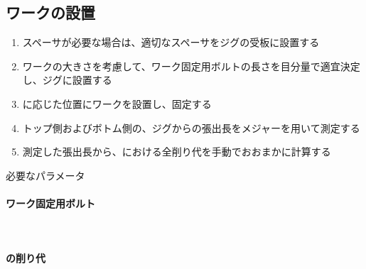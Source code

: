 \subsection{ワークの設置}
\begin{enumerate}[label=\sarrow]
\item {}スペーサが必要な場合は、適切なスペーサをジグの受板に設置する
\item {}ワークの大きさを考慮して、ワーク固定用ボルトの長さを目分量で適宜決定し、ジグに設置する
\item \ReAlocationLength に応じた位置にワークを設置し、固定する
\item トップ側およびボトム側の、ジグからの張出長をメジャーを用いて測定する
\item 測定した張出長から、\EndFacecutMilling における全削り代を手動でおおまかに計算する
\end{enumerate}
\begin{Parameter}{必要なパラメータ}
\paragraph*{ワーク固定用ボルト}
\PMACOD
\PMBDOD\\
\tcbline*
\paragraph*{\EndFacecut の削り代}
\PMJigLength
\PMTopReAlocationLength
\PMBottomReAlocationLength
{}\\
\end{Parameter}


\clearpage
